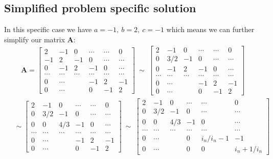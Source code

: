\documentclass[american,a4paper,12pt]{article}
\renewcommand{\vec}[1]{\mathbf{#1}} %
\begin{document}
\subsection{Simplified problem specific solution}
In this specific case we have $a = -1,\ b = 2,\ c = -1$ which means we can further simplify our matrix $\vec{A}$:
\begin{align*}
    \vec{A} =
    \begin{bmatrix}
    2 & -1 & 0 & \cdots & \cdots & 0 \\
    -1 & 2 & -1 & 0 & \cdots & \cdots \\
    0 & -1 & 2 & -1 & 0 & \cdots \\
    \cdots & \cdots & \cdots & \cdots & \cdots & \cdots \\
    0 & \cdots & & -1 & 2 & -1 \\
    0 & \cdots & & 0 & -1 & 2
    \end{bmatrix}
    \ \sim \ 
    \begin{bmatrix}
    2 & -1 & 0 & \cdots & \cdots & 0 \\
    0 & 3/2 & -1 & 0 & \cdots & \cdots \\
    0 & -1 & 2 & -1 & 0 & \cdots \\
    \cdots & \cdots & \cdots & \cdots & \cdots & \cdots \\
    0 & \cdots & & -1 & 2 & -1 \\
    0 & \cdots & & 0 & -1 & 2
    \end{bmatrix}
\end{align*}
\begin{align*}
    \quad \sim
    \begin{bmatrix}
    2 & -1 & 0 & \cdots & \cdots & 0 \\
    0 & 3/2 & -1 & 0 & \cdots & \cdots \\
    0 & 0 & 4/3 & -1 & 0 & \cdots \\
    \cdots & \cdots & \cdots & \cdots & \cdots & \cdots \\
    0 & \cdots & & -1 & 2 & -1 \\
    0 & \cdots & & 0 & -1 & 2
    \end{bmatrix}
    \ \sim \ 
    \begin{bmatrix}
    2 & -1 & 0 & \cdots & \cdots & 0 \\
    0 & 3/2 & -1 & 0 & \cdots & \cdots \\
    0 & 0 & 4/3 & -1 & 0 & \cdots \\
    \cdots & \cdots & \cdots & \cdots & \cdots & \cdots \\
    0 & \cdots & & 0 & i_n/{i_n-1} & -1 \\
    0 & \cdots & & 0 & 0 & {i_n+1}/i_n
    \end{bmatrix} \\
\end{align*}
\end{document}
